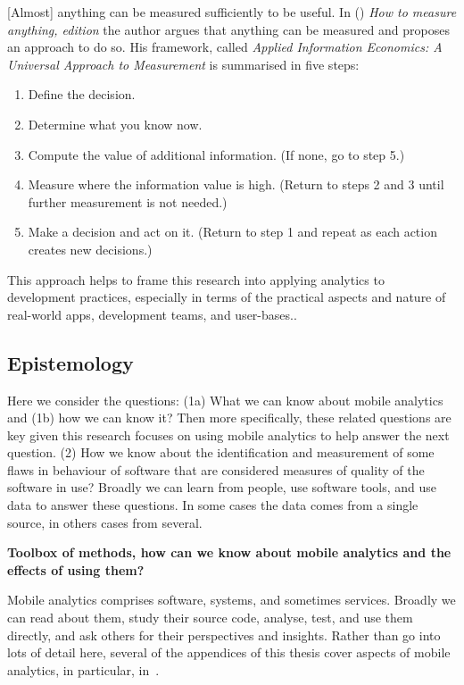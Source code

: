 [Almost] anything can be measured sufficiently to be useful. In (\cite{hubbard2014measure}) \emph{How to measure anything,  edition} the author argues that anything can be measured and proposes an approach to do so. His framework, called \emph{Applied Information Economics: A Universal Approach to Measurement} is summarised in five steps:

\begin{enumerate}
    \item Define the decision.
    \item Determine what you know now.
    \item Compute the value of additional information. (If none, go to step 5.)
    \item Measure where the information value is high. (Return to steps 2 and 3 until further measurement is not needed.)
    \item Make a decision and act on it. (Return to step 1 and repeat as each action creates new decisions.)
\end{enumerate} %

This approach helps to frame this research into applying analytics to development practices, especially in terms of the practical aspects and nature of real-world apps, development teams, and user-bases..

\subsection{Epistemology}
Here we consider the questions: (1a) What we can know about mobile analytics and (1b) how we can know it? Then more specifically, these related questions are key given this research focuses on using mobile analytics to help answer the next question. (2) How we know about the identification and measurement of some flaws in behaviour of software that are considered measures of quality of the software in use? Broadly we can learn from people, use software tools, and use data to answer these questions. In some cases the data comes from a single source, in others cases from several.

\textbf{Toolbox of methods, how can we know about mobile analytics and the effects of using them?} 

Mobile analytics comprises software, systems, and sometimes services. Broadly we can read about them, study their source code, analyse, test, and use them directly, and ask others for their perspectives and insights. Rather than go into lots of detail here, several of the appendices of this thesis cover aspects of mobile analytics, in particular, in~\href{chapter-on-mobile-analytics}{\emph{}}. 

